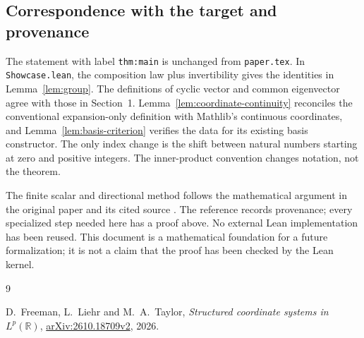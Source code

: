 \documentclass[reqno,a4paper,12pt]{amsart}
\theoremstyle{definition}
\newcommand{\R}{\mathbb R}
\newcommand{\ml}[1]{\nolinkurl{#1}}
\begin{document}
\subsection{Correspondence with the target and provenance}
The statement with label \ml{thm:main} is unchanged from
\ml{paper.tex}. In \ml{Showcase.lean}, the composition law plus
invertibility gives the identities in Lemma~\ref{lem:group}.
The definitions of cyclic vector and common eigenvector agree with
those in Section~1. Lemma~\ref{lem:coordinate-continuity} reconciles
the conventional expansion-only definition with Mathlib's continuous
coordinates, and Lemma~\ref{lem:basis-criterion} verifies the data for
its existing basis constructor. The only index change is the shift
between natural numbers starting at zero and positive integers.
The inner-product convention changes notation, not the theorem.

The finite scalar and directional method follows the mathematical
argument in the original paper and its cited source \cite{FLT}.
The reference records provenance; every specialized step needed here
has a proof above. No external Lean implementation has been reused.
This document is a mathematical foundation for a future formalization;
it is not a claim that the proof has been checked by the Lean kernel.

\begin{thebibliography}{9}
\raggedright
{} D.~Freeman, L.~Liehr and M.~A.~Taylor,
\emph{Structured coordinate systems in $L^p(\R)$},
\href{https://arxiv.org/html/2610.18709v2}{arXiv:2610.18709v2}, 2026.
\end{thebibliography}
\end{document}
